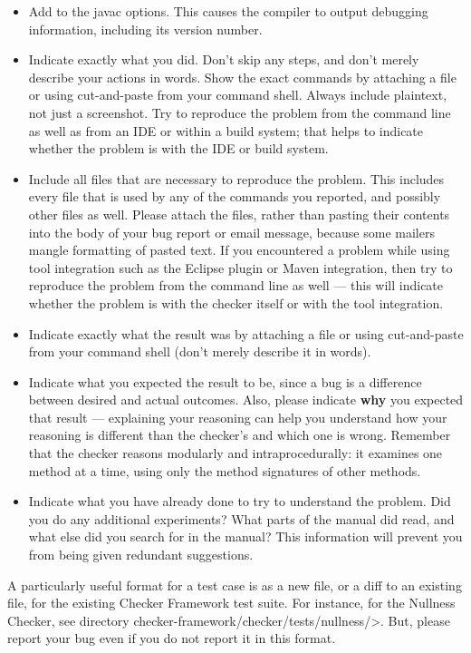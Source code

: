 \begin{itemize}
\item
  Add 
  to the javac options.  This causes the compiler to output
  debugging information, including its version number.
\item
  Indicate exactly what you did.  Don't skip any steps, and don't merely
  describe your actions in words.  Show the exact commands by attaching a
  file or using cut-and-paste from your command shell.  Always include
  plaintext, not just a screenshot.  Try to reproduce the problem from the
  command line as well as from an IDE or within a build system; that helps
  to indicate whether the problem is with the IDE or build system.
\item
  Include all files that are necessary to reproduce the problem.  This
  includes every file that is used by any of the commands you reported, and
  possibly other files as well.  Please attach the files, rather than
  pasting their contents into the body of your bug report or email message,
  because some mailers mangle formatting of pasted text.  If you
  encountered a problem while using tool integration such as the Eclipse
  plugin or Maven integration, then try to reproduce the problem from the
  command line as well --- this will indicate whether the problem is with
  the checker itself or with the tool integration.
\item
  Indicate exactly what the result was by attaching a file or using
  cut-and-paste from your command shell (don't merely describe it in
  words).
\item
  Indicate what you expected the result to be, since a bug is a difference
  between desired and actual outcomes.  Also, please indicate \textbf{why}
  you expected that result --- explaining your reasoning can help you
  understand how your reasoning is different than the checker's and which
  one is wrong.  Remember that the checker reasons modularly and
  intraprocedurally:  it examines one method at a time, using only the
  method signatures of other methods.
\item
  Indicate what you have already done to try to understand the problem.
  Did you do any additional experiments?  What parts of the manual did
  read, and what else did you search for in the manual?  This information
  will prevent you from being given redundant suggestions.
\end{itemize}

A particularly useful format for a test case is as a new file, or a diff to
an existing file, for the existing Checker Framework test suite.  For
instance, for the Nullness
Checker, see directory \<checker-framework/checker/tests/nullness/>.
But, please report your bug even if you do not report it in this format.

